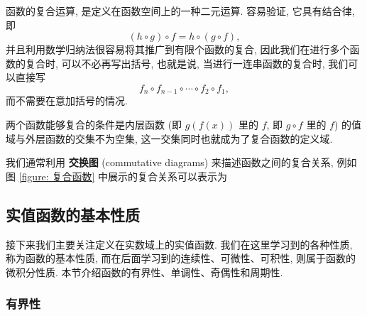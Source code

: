\documentclass[10pt,UTF8]{book} %
\begin{document}
函数的复合运算, 是定义在函数空间上的一种二元运算. 容易验证, 它具有结合律, 即
\[ (h \circ g) \circ f = h \circ (g \circ f), \]
并且利用数学归纳法很容易将其推广到有限个函数的复合,
因此我们在进行多个函数的复合时, 可以不必再写出括号, 也就是说, 当进行一连串函数的复合时,
我们可以直接写
\[ f_n \circ f_{n-1} \circ \cdots \circ f_2 \circ f_1, \]
而不需要在意加括号的情况.

两个函数能够复合的条件是内层函数 (即 $g(f(x))$ 里的 $f$, 即 $g \circ f$ 里的 $f$)
的值域与外层函数的交集不为空集, 这一交集同时也就成为了复合函数的定义域.

我们通常利用 \textbf{交换图} (commutative diagrams) 来描述函数之间的复合关系,
例如图 \ref{figure: 复合函数} 中展示的复合关系可以表示为
\begin{figure}[H]
    \centering
\end{figure}

\subsection{实值函数的基本性质}

接下来我们主要关注定义在实数域上的实值函数.
我们在这里学习到的各种性质, 称为函数的基本性质, 而在后面学习到的连续性、可微性、可积性,
则属于函数的微积分性质. 本节介绍函数的有界性、单调性、奇偶性和周期性.

\subsubsection{有界性}
\end{document}
